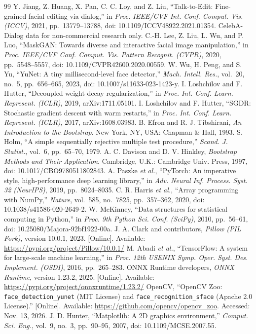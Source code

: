 \begin{thebibliography}{99}
 Y. Jiang, Z. Huang, X. Pan, C. C. Loy, and Z. Liu, ``Talk-to-Edit: Fine-grained facial editing via dialog,'' in \textit{Proc. IEEE/CVF Int. Conf. Comput. Vis. (ICCV)}, 2021, pp.~13779--13788, doi: 10.1109/ICCV48922.2021.01354. CelebA-Dialog data for non-commercial research only.
 C.-H. Lee, Z. Liu, L. Wu, and P. Luo, ``MaskGAN: Towards diverse and interactive facial image manipulation,'' in \textit{Proc. IEEE/CVF Conf. Comput. Vis. Pattern Recognit. (CVPR)}, 2020, pp.~5548--5557, doi: 10.1109/CVPR42600.2020.00559.
 W. Wu, H. Peng, and S. Yu, ``YuNet: A tiny millisecond-level face detector,'' \textit{Mach. Intell. Res.}, vol.~20, no.~5, pp.~656--665, 2023, doi: 10.1007/s11633-023-1423-y.
 I. Loshchilov and F. Hutter, ``Decoupled weight decay regularization,'' in \textit{Proc. Int. Conf. Learn. Represent. (ICLR)}, 2019, arXiv:1711.05101.
 I. Loshchilov and F. Hutter, ``SGDR: Stochastic gradient descent with warm restarts,'' in \textit{Proc. Int. Conf. Learn. Represent. (ICLR)}, 2017, arXiv:1608.03983.
 B. Efron and R. J. Tibshirani, \textit{An Introduction to the Bootstrap}. New York, NY, USA: Chapman \& Hall, 1993.
 S. Holm, ``A simple sequentially rejective multiple test procedure,'' \textit{Scand. J. Statist.}, vol.~6, pp.~65--70, 1979.
 A. C. Davison and D. V. Hinkley, \textit{Bootstrap Methods and Their Application}. Cambridge, U.K.: Cambridge Univ. Press, 1997, doi: 10.1017/CBO9780511802843.
 A. Paszke \textit{et al.}, ``PyTorch: An imperative style, high-performance deep learning library,'' in \textit{Adv. Neural Inf. Process. Syst. 32 (NeurIPS)}, 2019, pp.~8024--8035.
 C. R. Harris \textit{et al.}, ``Array programming with NumPy,'' \textit{Nature}, vol.~585, no.~7825, pp.~357--362, 2020, doi: 10.1038/s41586-020-2649-2.
 W. McKinney, ``Data structures for statistical computing in Python,'' in \textit{Proc. 9th Python Sci. Conf. (SciPy)}, 2010, pp.~56--61, doi: 10.25080/Majora-92bf1922-00a.
 J. A. Clark and contributors, \textit{Pillow (PIL Fork)}, version 10.0.1, 2023. [Online]. Available: \url{https://pypi.org/project/Pillow/10.0.1/}
 M. Abadi \textit{et al.}, ``TensorFlow: A system for large-scale machine learning,'' in \textit{Proc. 12th USENIX Symp. Oper. Syst. Des. Implement. (OSDI)}, 2016, pp.~265--283.
 ONNX Runtime developers, \textit{ONNX Runtime}, version 1.23.2, 2025. [Online]. Available: \url{https://pypi.org/project/onnxruntime/1.23.2/}
 OpenCV, ``OpenCV Zoo: \texttt{face\_detection\_yunet} (MIT License) and \texttt{face\_recognition\_sface} (Apache 2.0 License).'' [Online]. Available: \url{https://github.com/opencv/opencv_zoo}. Accessed: Nov. 13, 2026.
 J. D. Hunter, ``Matplotlib: A 2D graphics environment,'' \textit{Comput. Sci. Eng.}, vol.~9, no.~3, pp.~90--95, 2007, doi: 10.1109/MCSE.2007.55.
\end{thebibliography}
